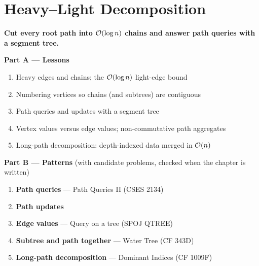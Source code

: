 \chapter{Heavy--Light Decomposition}
\label{ch:hld}

\begin{tcolorbox}[enhanced, colback=white, colframe=secondaryblue, boxrule=1pt, arc=2mm]
\textbf{\large\textcolor{primaryblue}{Cut every root path into $\mathcal{O}(\log n)$ chains and answer path queries with a segment tree.}}
\end{tcolorbox}


\begin{plannedbox}
\textbf{Part A --- Lessons}
\begin{enumerate}[leftmargin=*, label=\textbf{A\arabic*.}, itemsep=1pt]
    \item Heavy edges and chains; the $\mathcal{O}(\log n)$ light-edge bound
    \item Numbering vertices so chains (and subtrees) are contiguous
    \item Path queries and updates with a segment tree
    \item Vertex values versus edge values; non-commutative path aggregates
    \item Long-path decomposition: depth-indexed data merged in $\mathcal{O}(n)$
\end{enumerate}
\textbf{Part B --- Patterns} (with candidate problems, checked when the chapter is written)
\begin{enumerate}[leftmargin=*, label=\textbf{P\arabic*.}, itemsep=1pt]
    \item \textbf{Path queries} --- Path Queries II {\small\color{darkgray}(CSES 2134)}
    \item \textbf{Path updates}
    \item \textbf{Edge values} --- Query on a tree {\small\color{darkgray}(SPOJ QTREE)}
    \item \textbf{Subtree and path together} --- Water Tree {\small\color{darkgray}(CF 343D)}
    \item \textbf{Long-path decomposition} --- Dominant Indices {\small\color{darkgray}(CF 1009F)}
\end{enumerate}
\end{plannedbox}
